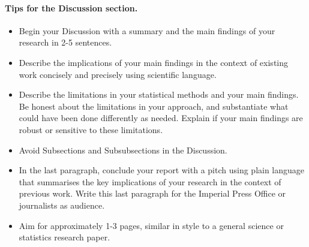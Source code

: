 \paragraph{Tips for the Discussion section.} 

\begin{itemize}
    \item Begin your Discussion with a summary and the main findings of your research in 2-5 sentences.
    \item Describe the implications of your main findings in the context of existing work concisely and precisely using scientific language. 
    \item Describe the limitations in your statistical methods and your main findings. Be honest about the limitations in your approach, and substantiate what could have been done differently as needed. Explain if your main findings are robust or sensitive to these limitations.
    \item Avoid Subsections and Subsubsections in the Discussion.
    \item In the last paragraph, conclude your report with a pitch using plain language that summarises the key implications of your research in the context of previous work. Write this last paragraph for the Imperial Press Office or journalists as audience.
    \item Aim for approximately 1-3 pages, similar in style to a general science or statistics research paper.
\end{itemize}